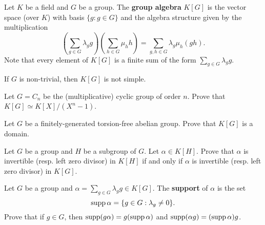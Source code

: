 \lecture{}


Let $K$ be a field and $G$ be a group. The \textbf{group algebra} $K[G]$ 
is the vector space (over $K$) with basis $\{g:g\in G\}$ 
and the algebra structure given by the multiplication
\[
	\left(\sum_{g\in G}\lambda_gg\right)\left(\sum_{h\in G}\mu_hh\right)
	=\sum_{g,h\in G}\lambda_g\mu_h(gh).
\]
Note that every element of $K[G]$ is a finite sum of the form $\sum_{g\in G}\lambda_gg$.

\begin{exercise}
\label{xc:K[G]notsimple}
    If $G$ is non-trivial, then $K[G]$ is not simple. 
\end{exercise}

\begin{exercise}
	Let $G=C_n$ be the (multiplicative) cyclic group of order $n$. Prove that 
	$K[G]\simeq K[X]/(X^n-1)$. 
\end{exercise}

\begin{exercise}
	Let $G$ be a finitely-generated torsion-free abelian group. Prove that 
	$K[G]$ is a domain. 
\end{exercise}

\begin{exercise}
	Let $G$ be a group and $H$ be a subgroup of $G$. Let $\alpha\in K[H]$. Prove that 
    $\alpha$ is invertible (resp. left zero divisor) in $K[H]$ if and only if 
	$\alpha$ is invertible (resp. left zero divisor) in
	$K[G]$.
\end{exercise}

\begin{exercise}
	Let $G$ be a group and $\alpha=\sum_{g\in G}\lambda_gg\in K[G]$.  
	The \textbf{support} of $\alpha$ is the set 
	\[
		\operatorname{supp}\alpha=\{g\in G:\lambda_g\ne 0\}.
	\]
	Prove that if $g\in G$, then 
	$\operatorname{supp}(g\alpha)=g(\operatorname{supp}\alpha)$ and $\operatorname{supp}(\alpha g)=(\operatorname{supp}\alpha)g$.
\end{exercise}


